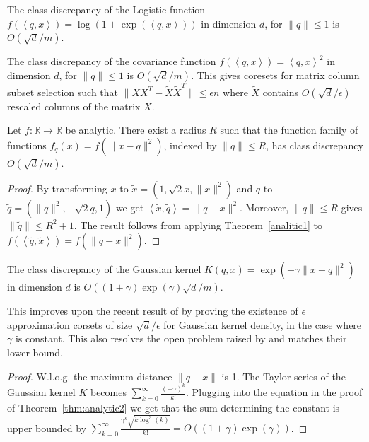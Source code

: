 \documentclass[anon,12pt]{colt2019} %
\newcommand{\ip}[1]{\left \langle #1 \right \rangle}
\newcommand{\R}{\mathbb{R}}
\newcommand{\eps}{\epsilon}
\begin{document}
\begin{corollary}
The class discrepancy of the Logistic function $f(\ip{q,x}) = \log(1+\exp(\ip{q,x}))$ in dimension $d$, for $\|q\| \leq 1$ is $O(\sqrt{d}/m)$.
\end{corollary}

\begin{corollary}
The class discrepancy of the covariance function $f(\ip{q,x}) = \ip{q,x}^2$ in dimension $d$, for $\|q\| \leq 1$ is $O(\sqrt{d}/m)$. This gives coresets for matrix column subset selection such that $\|XX^T - \tilde X \tilde X^T\| \le \eps n$ where $\tilde X$ contains $O(\sqrt{d}/\eps)$ rescaled columns of the matrix $X$.
\end{corollary}



\begin{theorem} \label{thm:analytic2}
Let $f:\R\rightarrow\R$ be analytic. There exist a radius $R$ such that the function family of functions $f_q(x) = f(\|x-q\|^2)$, indexed by $\|q\| \leq R$, has class discrepancy $O(\sqrt{d}/m)$. 
\end{theorem}
\begin{proof}
By transforming $x$ to $\tilde{x} = (1, \sqrt{2}x, \|x\|^2)$ and $q$ to $\tilde{q} = (\|q\|^2, -\sqrt{2}q, 1)$ we get $\ip{\tilde{x},\tilde{q}} = \|q-x\|^2$. Moreover, $\|q\| \le R$ gives $\|\tilde q\| \le R^2+1$. The result follows from applying Theorem~\ref{analitic1} to $f(\ip{ \tilde q, \tilde x}) = f(\|q-x\|^2)$.
\end{proof}

\begin{corollary}
The class discrepancy of the Gaussian kernel $K(q,x) = \exp(-\gamma \|x-q\|^2)$ in dimension $d$ is $O((1+\gamma)\exp(\gamma)\sqrt{d}/m)$.
\end{corollary} 
This improves upon the recent result of \cite{DBLP:journals/corr/abs-1802-01751} by proving the existence of $\eps$ approximation corsets of size $\sqrt{d}/\eps$ for Gaussian kernel density, in the case where $\gamma$ is constant. 
This also resolves the open problem raised by \cite{DBLP:journals/corr/abs-1802-01751} and matches their lower bound.   

\begin{proof}
W.l.o.g. the maximum distance $\|q-x\|$ is 1. The Taylor series of the Gaussian kernel $K$ becomes
$ \sum_{k=0}^\infty \frac{(-\gamma)^k}{k!} $.
Plugging into the equation in the proof of Theorem~\ref{thm:analytic2} we get that the sum determining the constant is upper bounded by
$ \sum_{k=0}^\infty \frac{\gamma^{k}\sqrt{ k\log^3(k)}}{k!} = O\left((1+\gamma) \exp(\gamma)\right)$.
\end{proof}
\end{document}
